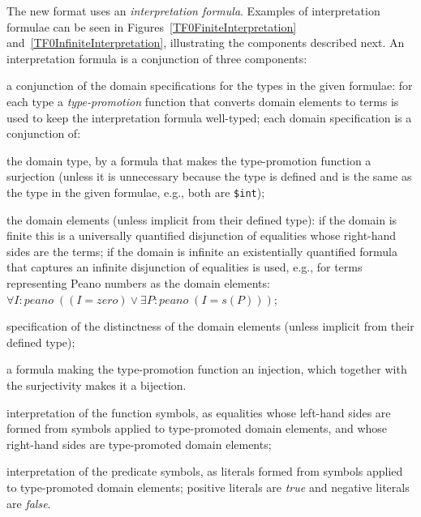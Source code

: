 \documentclass{easychair}
\newcommand{\smalltt}[1]{\small \texttt{#1}}
\newenvironment{packed_itemize}{
\vspace*{-0.2em}
\begin{itemize}
\setlength{\partopsep}{0pt}
\setlength{\itemsep}{1pt}
\setlength{\parskip}{0pt}
\setlength{\parsep}{0pt}
}{\end{itemize}}
\begin{document}
The new format uses an {\em interpretation formula}. 
Examples of interpretation formulae can be seen in Figures~\ref{TF0FiniteInterpretation}
and~\ref{TF0InfiniteInterpretation}, illustrating the components described next. 
An interpretation formula is a conjunction of three components:
\begin{packed_itemize}
\item a conjunction of the domain specifications for the types in the given formulae:
      for each type a {\em type-promotion} function that converts domain elements to terms is
      used to keep the interpretation formula well-typed; each domain specification is a 
      conjunction of:
      \begin{packed_itemize}
      \item the domain type, by a formula that makes the type-promotion function a surjection 
            (unless it is unnecessary because the type is defined and is the same as the type in 
            the given formulae, e.g., both are {\smalltt{\$int}});
      \item the domain elements (unless implicit from their defined type): if the domain is
            finite this is a universally quantified disjunction of equalities whose right-hand 
            sides are the terms; if the domain is infinite an existentially quantified formula 
            that captures an infinite disjunction of equalities is used, e.g., for terms 
            representing Peano numbers as the domain elements:\\
            \hspace*{0.5cm}$\forall I{:}peano\;((I = zero) \vee \exists P{:}peano\;(I = s(P)))$;
      \item specification of the distinctness of the domain elements (unless implicit from their
            defined type);
      \item a formula making the type-promotion function an injection,
            which together with the surjectivity makes it a bijection.
      \end{packed_itemize}
\item interpretation of the function symbols, as equalities whose left-hand sides are 
      formed from symbols applied to type-promoted domain elements, and whose right-hand sides 
      are type-promoted domain elements;
\item interpretation of the predicate symbols, as literals formed from symbols applied
      to type-promoted domain elements; positive literals are {\em true} and negative literals 
      are {\em false}.
\end{packed_itemize}
\end{document}
